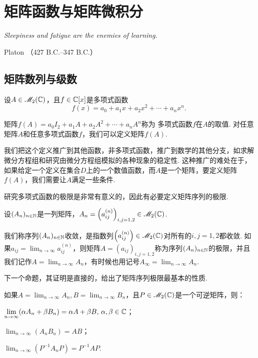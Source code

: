 \chapter{矩阵函数与矩阵微积分}
\begin{proverb}
  { \itshape
   Sleepiness and fatigue are the enemies of learning.
  }

\hfill Platon （427 B.C.--347 B.C.）
\end{proverb}

\section{矩阵数列与级数}
设$A\in\mathscr M_2(\mathbb C)$，且$f\in \mathbb C[x]$是多项式函数
\[
  f(x) = a_0 + a_1x + a_2x^2 + \cdots + a_nx^n.
\]

矩阵$f(A)=a_0I_2+a_1A+a_2A^2+\cdots+a_nA^n$称为 多项式函数$f$在$A$的取值. 对任意矩阵$A$和任意多项式函数$f$，我们可以定义矩阵$f(A)$.

我们把这个定义推广到其他函数，非多项式函数，推广到数学的其他分支，如求解微分方程组和研究由微分方程组模拟的各种现象的稳定性. 这种推广的难处在于，如果给定一个定义在集合$D$上的一个数值函数，而$A$是一个矩阵，要定义矩阵$f(A)$，我们需要让$A$满足一些条件.

研究多项式函数的极限是非常有意义的，因此有必要定义矩阵序列的极限.

设$(A_n)_{n\in\mathbb N}$是一列矩阵，$A_n=\left(a_{ij}^{(n)}\right)_{i,j=1,2}\in\MM_2(\MC)$.

\begin{definition}
  我们称序列$(A_n)_{n\in\mathbb N}${\kaishu 收敛}，是指数列$\left(a_ {ij}^{(n)}\right)\in\MM_2(\MC)$对所有的$i,j=1,2$都收敛. 如果$a_{ij}=\lim_{n\to\infty}a_{ij}^{(n)}$，则矩阵$A=(a_{ij})_{i,j=1,2}$称为{\kaishu 序列$(A_n)_{n\in\mathbb N}$的极限}，并且我们记作$A=\lim_{n\to\infty}A_n$，有时候也用记号$A_\infty=\lim_{n\to\infty}A_n$.
\end{definition}

下一个命题，其证明是直接的，给出了矩阵序列极限最基本的性质.
\begin{prop}
  如果$A=\lim_{n\to\infty}A_n,B=\lim_{n\to\infty}B_n$，且$P\in\mathscr M_2(\mathbb C)$是一个可逆矩阵，则：
  \begin{enum}
    \item $\lim_{n\to\infty}(\alpha A_n+\beta B_n)=\alpha A+\beta B,\,\alpha,\beta\in\MC$；
    \item $\lim_{n\to\infty}(A_nB_n)=AB$；
    \item\label{prop4.1c} $\lim_{n\to\infty}(P^{-1}A_nP)=P^{-1}AP$.
  \end{enum}
\end{prop}

